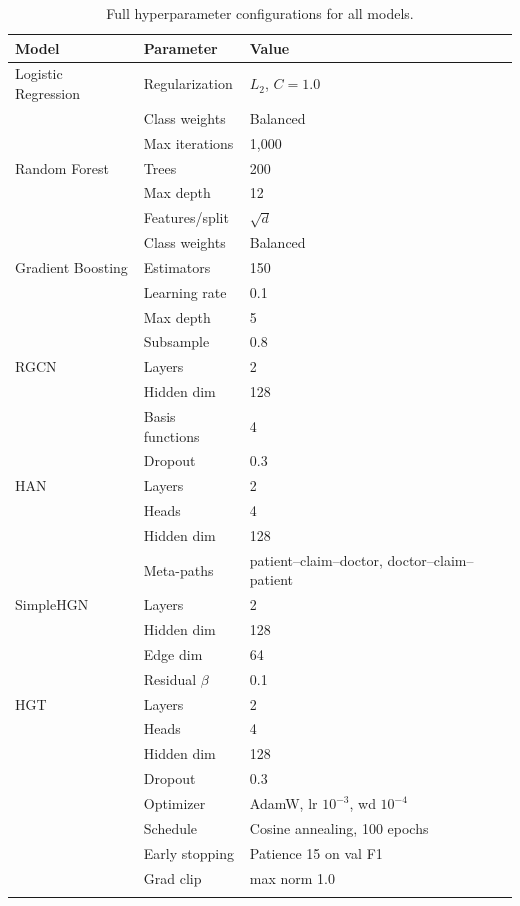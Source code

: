 \documentclass[pdflatex,sn-mathphys-num]{sn-jnl}
\theoremstyle{thmstyleone}
\theoremstyle{thmstyletwo}
\theoremstyle{thmstylethree}
\begin{document}
\begin{appendices}
\begin{table}[h]
\caption{Full hyperparameter configurations for all models.}\label{tab:hyperparams}
\begin{tabular}{@{}lll@{}}
\toprule
Model & Parameter & Value \\
\midrule
Logistic Regression & Regularization  & $L_2$, $C=1.0$ \\
                    & Class weights   & Balanced \\
                    & Max iterations  & 1,000 \\
\midrule
Random Forest       & Trees           & 200 \\
                    & Max depth       & 12 \\
                    & Features/split  & $\sqrt{d}$ \\
                    & Class weights   & Balanced \\
\midrule
Gradient Boosting   & Estimators      & 150 \\
                    & Learning rate   & 0.1 \\
                    & Max depth       & 5 \\
                    & Subsample       & 0.8 \\
\midrule
RGCN                & Layers          & 2 \\
                    & Hidden dim      & 128 \\
                    & Basis functions & 4 \\
                    & Dropout         & 0.3 \\
\midrule
HAN                 & Layers          & 2 \\
                    & Heads           & 4 \\
                    & Hidden dim      & 128 \\
                    & Meta-paths      & patient--claim--doctor, doctor--claim--patient \\
\midrule
SimpleHGN           & Layers          & 2 \\
                    & Hidden dim      & 128 \\
                    & Edge dim        & 64 \\
                    & Residual $\beta$ & 0.1 \\
\midrule
HGT                 & Layers          & 2 \\
                    & Heads           & 4 \\
                    & Hidden dim      & 128 \\
                    & Dropout         & 0.3 \\
                    & Optimizer       & AdamW, lr $10^{-3}$, wd $10^{-4}$ \\
                    & Schedule        & Cosine annealing, 100 epochs \\
                    & Early stopping  & Patience 15 on val F1 \\
                    & Grad clip       & max norm 1.0 \\
\botrule
\end{tabular}
\end{table}


\end{appendices}
\end{document}
